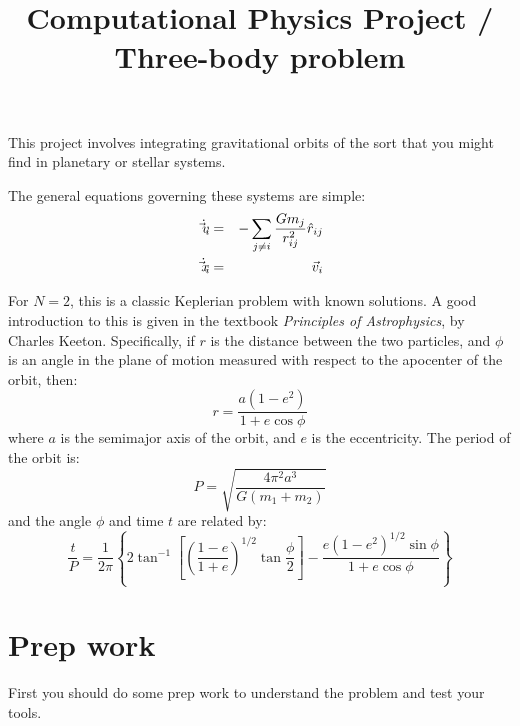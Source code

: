 \documentclass[11pt, preprint]{aastex}
\begin{document}
\title{\bf Computational Physics Project / Three-body problem}

This project involves integrating gravitational orbits of the sort
that you might find in planetary or stellar systems. 

The general equations governing these systems are simple:
\begin{eqnarray}
\dot{\vec{v}_i} &=& - \sum_{j \ne i} \frac{Gm_j}{r_{ij}^2} {\hat r}_{ij} \cr
\dot{\vec{x}_i} &=& \vec{v}_i
\end{eqnarray}

For $N=2$, this is a classic Keplerian problem with known solutions.
A good introduction to this is given in the textbook {\it Principles
  of Astrophysics}, by Charles Keeton. Specifically, if $r$ is the
distance between the two particles, and $\phi$ is an angle in the
plane of motion measured with respect to the apocenter of the orbit,
then:
\begin{equation}
r = \frac{a(1-e^2)}{1+e \cos\phi}
\end{equation}
where $a$ is the semimajor axis of the orbit, and $e$ is the
eccentricity. The period of the orbit is:
\begin{equation}
P = \sqrt{\frac{4\pi^2 a^3}{G(m_1 + m_2)}}
\end{equation}
and the angle $\phi$ and time $t$ are related by:
\begin{equation}
  \frac{t}{P} = \frac{1}{2\pi}\left\{
    2\tan^{-1}\left[\left(\frac{1-e}{1+e}\right)^{1/2}
      \tan\frac{\phi}{2}\right]
    - \frac{e(1-e^2)^{1/2} \sin\phi}{1+e\cos\phi}\right\}
\end{equation}

\section{Prep work}

First you should do some prep work to understand the problem and test
your tools.
\end{document}
